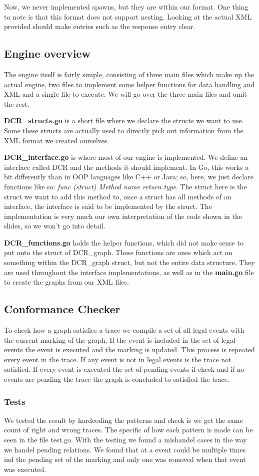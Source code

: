 Now, we never implemented spawns, but they are within our format. One thing to note is that this
format does not support nesting. Looking at the actual XML provided should make entries such as the
response entry clear.

\subsection*{Engine overview}
The engine itself is fairly simple, consisting of three main files which make up the actual engine,
two files to implement some helper functions for data handling and XML and a single file to
execute. We will go over the three main files and omit the rest.

\textbf{DCR\_structs.go} is a short file where we declare the structs we want to use. Some these
structs are actually used to directly pick out information from the XML format we created
ourselves. 

\textbf{DCR\_interface.go} is where most of our engine is implemented. We define an interface
called DCR and the methods it should implement. In Go, this works a bit differently than in OOP
languages like C++ or Java; so, here, we just declare functions like so: \textit{func (struct)
Method name return type}. The struct here is the struct we want to add this method to, once
a struct has all methods of an interface, the interface is said to be implemented by the struct.
The implementation is very much our own interpretation of the code shown in the slides, so we won't
go into detail.

\textbf{DCR\_functions.go} holds the helper functions, which did not make sense to put onto the
struct of DCR\_graph. These functions are ones which act on something within the DCR\_graph struct,
but not the entire data structure. They are used throughout the interface implementations, as well as in the
\textbf{main.go} file to create the graphs from our XML files. 

\subsection*{Conformance Checker}
To check how a graph satisfies a trace we compile a set of all legal events
with the current marking of the graph. If the event is included in the set of legal
events the event is executed and the marking is updated. This process is repeated
every event in the trace. If any event is not in legal events is the trace not
satisfied. If every event is executed the set of pending events if check and if no
events are pending the trace the graph is concluded to satisfied the trace.

\subsubsection*{Tests}
We tested the result by hardcoding the patterns and check is we get the same
count of right and wrong traces. The specific of how each pattern is made can be
seen in the file test.go. With the testing we found a mishandel cases in the way
we handel pending relations. We found that at a event could be multiple times
ind the pending set of the marking and only one was removed when that event was
executed.
